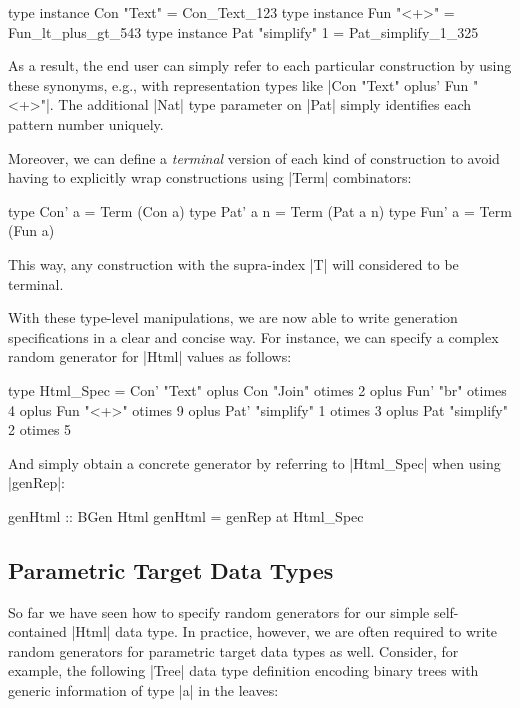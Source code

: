 \begin{code}
type instance Con "Text"        = Con_Text_123
type instance Fun "<+>"         = Fun_lt_plus_gt_543
type instance Pat "simplify" 1  = Pat_simplify_1_325
\end{code}
%
As a result, the end user can simply refer to each particular construction by
using these synonyms, e.g., with representation types like |Con "Text" oplus'
Fun "<+>"|.
%
The additional |Nat| type parameter on |Pat| simply identifies each pattern
number uniquely.


Moreover, we can define a \emph{terminal} version of each kind of construction
to avoid having to explicitly wrap constructions using |Term| combinators:

\begin{code}
type Con' a    = Term  (Con a)
type Pat' a n  = Term  (Pat a n)
type Fun' a    = Term  (Fun a)
\end{code}
%
This way, any construction with the supra-index |T| will considered to be
terminal.


With these type-level manipulations, we are now able to write generation
specifications in a clear and concise way.
%
For instance, we can specify a complex random generator for |Html| values as
follows:

\begin{code}
type Html_Spec  =      Con'  "Text"
                oplus  Con   "Join"         otimes 2
                oplus  Fun'  "br"           otimes 4
                oplus  Fun   "<+>"          otimes 9
                oplus  Pat'  "simplify"  1  otimes 3
                oplus  Pat   "simplify"  2  otimes 5
\end{code}

And simply obtain a concrete generator by referring to |Html_Spec| when using
|genRep|:

\begin{code}
genHtml :: BGen Html
genHtml = genRep at Html_Spec
\end{code}


%
\subsection{Parametric Target Data Types }

So far we have seen how to specify random generators for our simple
self-contained |Html| data type.
%
In practice, however, we are often required to write random generators for
parametric target data types as well.
%
Consider, for example, the following |Tree| data type definition encoding binary
trees with generic information of type |a| in the leaves:

